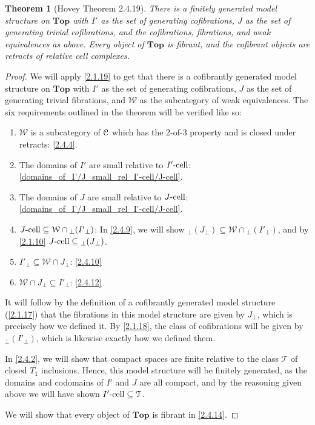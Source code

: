 \documentclass{amsart}
\theoremstyle{plain}
\newtheorem{theorem}{Theorem}[section]
\theoremstyle{definition}
\newcommand{\Top}{\mbf{Top}}
\newcommand{\sseq}{\subseteq}
\newcommand{\0}{\mathbf{0}}
\newcommand{\cC}{\mathcal C}
\newcommand{\p}{{_\perp}}
\newcommand{\cT}{\mathcal T}
\newcommand{\cW}{\mathcal W}
\newcommand{\mbf}[1]{\mathbf{#1}}
\renewcommand{\(}{\left(}
\renewcommand{\)}{\right)}
\def\scr{\EuScript}
\def\cC{\scr{C}}
\newcommand{\cell}{\text-\mathrm{cell}}
\begin{document}
\begin{theorem}[Hovey Theorem 2.4.19]\label{2.4.19}
  There is a finitely generated model structure on $\Top$ with $I'$ as the set of generating cofibrations, $J$ as the set of generating trivial cofibrations, and the cofibrations, fibrations, and weak equivalences as above. Every object of $\Top$ is fibrant, and the cofibrant objects are retracts of relative cell complexes.
\end{theorem}
\begin{proof}
  We will apply \autoref{2.1.19} to get that there is a cofibrantly generated model structure on $\Top$ with $I'$ as the set of generating cofibrations, $J$ as the set of generating trivial fibrations, and $\cW$ as the subcategory of weak equivalences. The six requirements outlined in the theorem will be verified like so:
  \begin{enumerate}[label=\arabic*.,noitemsep,topsep=0pt]
    \item $\cW$ is a subcategory of $\cC$ which has the 2-of-3 property and is closed under retracts: \autoref{2.4.4}.
    \item The domains of $I'$ are small relative to $I'\cell$: \autoref{domains_of_I'/J_small_rel_I'-cell/J-cell}.
    \item The domains of $J$ are small relative to $J\cell$: \autoref{domains_of_I'/J_small_rel_I'-cell/J-cell}.
    \item $J\cell\sseq\cW\cap {\p( I'\p )}$: In \autoref{2.4.9}, we will show ${\p({J}\p)}\sseq\cW\cap {\p( I'\p )}$, and by \autoref{2.1.10} $J\cell\sseq {\p({J}\p)}$.
    \item $ I'\p \sseq\cW\cap J\p$: \autoref{2.4.10}
    \item $\cW\cap J\p\sseq  I'\p $: \autoref{2.4.12}
  \end{enumerate}
  It will follow by the definition of a cofibrantly generated model structure (\autoref{2.1.17}) that the fibrations in this model structure are given by $J\p$, which is precisely how we defined it. By \autoref{2.1.18}, the class of cofibrations will be given by ${\p( I'\p )}$, which is likewise exactly how we defined them.

  In \autoref{2.4.2}, we will show that compact spaces are finite relative to the class $\cT$ of closed $T_1$ inclusions. Hence, this model structure will be finitely generated, as the domains and codomains of $I'$ and $J$ are all compact, and by the reasoning given above we will have shown $I'\cell\sseq\cT$.
  
  We will show that every object of $\Top$ is fibrant in \autoref{2.4.14}. 
\end{proof}
\end{document}
